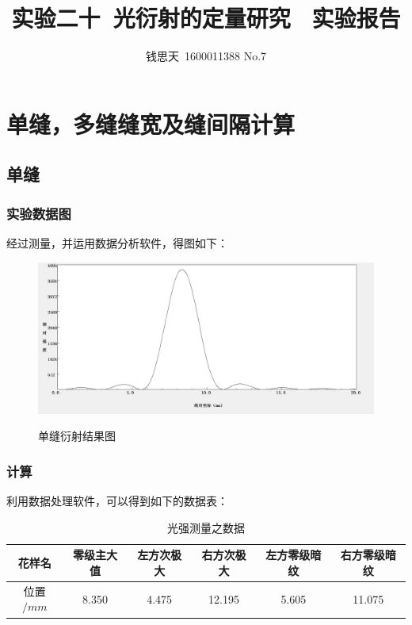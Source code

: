 \documentclass{ctexart}
\author{钱思天\ 1600011388 No.7}
\title{实验二十\ 光衍射的定量研究 \ 实验报告}
\begin{document}
      \maketitle
      \section{单缝，多缝缝宽及缝间隔计算}
      \subsection{单缝}
      \subsubsection{实验数据图}
      经过测量，并运用数据分析软件，得图如下：
      \begin{figure}[H]
        \centering
        \caption{单缝衍射结果图}
        \includegraphics[width=\textwidth]{1.jpg}
        \label{fig:digit}
          
      \end{figure}

\subsubsection{计算}
利用数据处理软件，可以得到如下的数据表：
\begin{table}[H]
    \centering
    \caption{光强测量之数据}
      \begin{tabular}{|c|c|c|c|c|c|}\hline
      花样名   &{零级主大值} &{左方次极大} &{右方次极大} &{左方零级暗纹} &{右方零级暗纹} \\ \hline
      位置$/mm$ & 8.350 & 4.475 & 12.195 & 5.605 & 11.075 \\\hline
      \end{tabular}%
    \label{tab:addlabel}%
  \end{table}%
  
\end{document}
